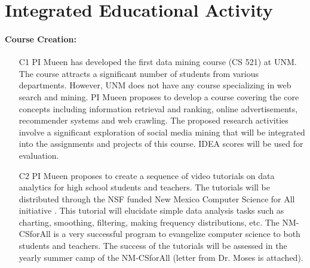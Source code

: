 
\section{Integrated Educational Activity}

\paragraph{Course Creation:}


\begin{itemize}[noitemsep,leftmargin=*]
\vspace{-0.2cm}
\item [C1] PI Mueen has developed the first data mining course (CS 521) at UNM. 
The course attracts a significant number of students from various departments. However, UNM does not have any course specializing in web search and mining. PI Mueen proposes to develop a course covering the core concepts including information retrieval and ranking, online advertisements, recommender systems and web crawling. The proposed research activities involve a significant exploration of social media mining that will be integrated into the assignments and projects of this course. IDEA scores will be used for evaluation.


\item[C2] PI Mueen proposes to create a sequence of video tutorials on data analytics for high school students and teachers. The tutorials will be distributed through the NSF funded New Mexico Computer Science for All initiative \cite{cs4all}. This tutorial will elucidate simple data analysis tasks such as charting, smoothing, filtering, making frequency distributions, etc. The NM-CSforAll is a very successful program to evangelize computer science to both students and teachers. The success of the tutorials will be assessed in the yearly summer camp of the NM-CSforAll (letter from Dr. Moses is attached).
\end{itemize}


